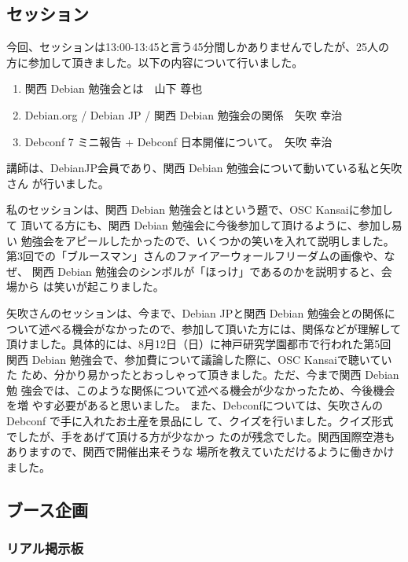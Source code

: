 \documentclass[mingoth,a4paper]{jsarticle}
\begin{document}
\subsection{セッション}

今回、セッションは13:00-13:45と言う45分間しかありませんでしたが、25人の
方に参加して頂きました。以下の内容について行いました。

\begin{enumerate}
 \item 関西 Debian 勉強会とは　山下 尊也
 \item Debian.org / Debian JP / 関西 Debian 勉強会の関係　矢吹 幸治
 \item Debconf 7 ミニ報告 + Debconf 日本開催について。　矢吹 幸治
\end{enumerate}

講師は、DebianJP会員であり、関西 Debian 勉強会について動いている私と矢吹さん
が行いました。

私のセッションは、関西 Debian 勉強会とはという題で、OSC Kansaiに参加して
頂いてる方にも、関西 Debian 勉強会に今後参加して頂けるように、参加し易い
勉強会をアピールしたかったので、いくつかの笑いを入れて説明しました。
第3回での「ブルースマン」さんのファイアーウォールフリーダムの画像や、なぜ、
関西 Debian 勉強会のシンボルが「ほっけ」であるのかを説明すると、会場から
は笑いが起こりました。

矢吹さんのセッションは、今まで、Debian JPと関西 Debian 勉強会との関係に
ついて述べる機会がなかったので、参加して頂いた方には、関係などが理解して
頂けました。具体的には、8月12日（日）に神戸研究学園都市で行われた第5回
関西 Debian 勉強会で、参加費について議論した際に、OSC Kansaiで聴いていた
ため、分かり易かったとおっしゃって頂きました。ただ、今まで関西 Debian 勉
強会では、このような関係について述べる機会が少なかったため、今後機会を増
やす必要があると思いました。
また、Debconfについては、矢吹さんの Debconf で手に入れたお土産を景品にし
て、クイズを行いました。クイズ形式でしたが、手をあげて頂ける方が少なかっ
たのが残念でした。関西国際空港もありますので、関西で開催出来そうな
場所を教えていただけるように働きかけました。

\subsection{ブース企画}

\subsubsection{リアル掲示板}
\end{document}
